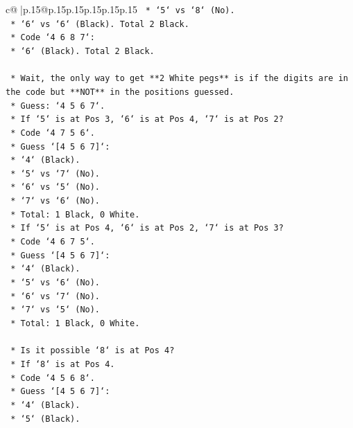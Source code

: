 \documentclass{article}
\begin{document}
{\begin{supertabular}{c@{$\;$}|p{.15\linewidth}@{}p{.15\linewidth}p{.15\linewidth}p{.15\linewidth}p{.15\linewidth}p{.15\linewidth}}
{{{\texttt{                *   `5` vs `8` (No).} \\
\texttt{                *   `6` vs `6` (Black). Total 2 Black.} \\
\texttt{        *   Code `4 6 8 7`:} \\
\texttt{            *   `6` (Black). Total 2 Black.} \\
\\ 
\texttt{    *   Wait, the only way to get **2 White pegs** is if the digits are in the code but **NOT** in the positions guessed.} \\
\texttt{    *   Guess: `4 5 6 7`.} \\
\texttt{    *   If `5` is at Pos 3, `6` is at Pos 4, `7` is at Pos 2?} \\
\texttt{        *   Code `4 7 5 6`.} \\
\texttt{        *   Guess `{[}4 5 6 7{]}`:} \\
\texttt{            *   `4` (Black).} \\
\texttt{            *   `5` vs `7` (No).} \\
\texttt{            *   `6` vs `5` (No).} \\
\texttt{            *   `7` vs `6` (No).} \\
\texttt{            *   Total: 1 Black, 0 White.} \\
\texttt{    *   If `5` is at Pos 4, `6` is at Pos 2, `7` is at Pos 3?} \\
\texttt{        *   Code `4 6 7 5`.} \\
\texttt{        *   Guess `{[}4 5 6 7{]}`:} \\
\texttt{            *   `4` (Black).} \\
\texttt{            *   `5` vs `6` (No).} \\
\texttt{            *   `6` vs `7` (No).} \\
\texttt{            *   `7` vs `5` (No).} \\
\texttt{            *   Total: 1 Black, 0 White.} \\
\\ 
\texttt{    *   Is it possible `8` is at Pos 4?} \\
\texttt{        *   If `8` is at Pos 4.} \\
\texttt{        *   Code `4 5 6 8`.} \\
\texttt{        *   Guess `{[}4 5 6 7{]}`:} \\
\texttt{            *   `4` (Black).} \\
\texttt{            *   `5` (Black).} \\
}}}
\end{supertabular}}
\end{document}
